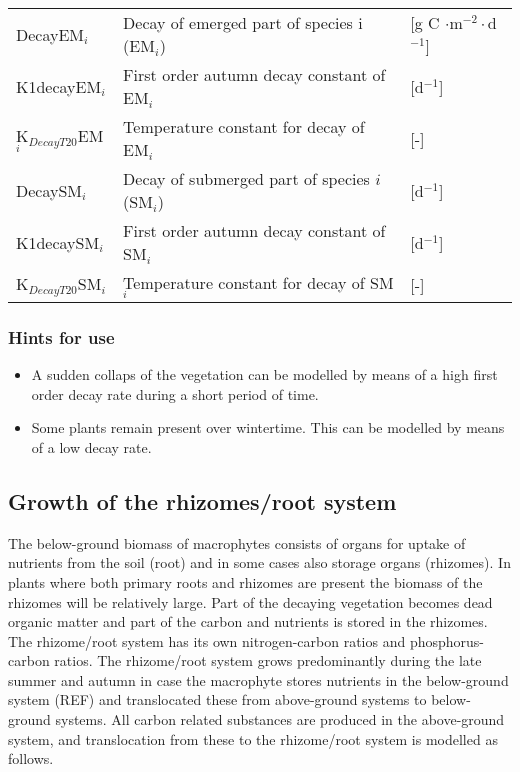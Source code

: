 \begin{tabular}{lll}
DecayEM$_i$          & Decay of emerged part of species i (EM$_i$)    & [g C $\cdot$m$^{-2}\cdot$d$^{-1}$] \\
K1decayEM$_i$        & First order autumn decay constant of EM$_i$    & [d$^{-1}$]         \\
K$_{DecayT20}$EM$_i$ & Temperature constant for decay of EM$_i$       & [-]                \\
DecaySM$_i$          & Decay of submerged part of species $i$ (SM$_i$)  & [d$^{-1}$]         \\
K1decaySM$_i$        & First order autumn decay constant of SM$_i$    & [d$^{-1}$]         \\
K$_{DecayT20}$SM$_i$ & Temperature constant for decay of SM$_i$       & [-]                \\
\end{tabular}

\subsubsection{Hints for use}
\begin{itemize}
\item
A sudden collaps of the vegetation can be modelled by means of a high first order decay rate during a
short period of time.
\item
Some plants remain present over wintertime. This can be modelled by means of a low decay rate.
\end{itemize}

\subsection{Growth of the rhizomes/root system}
The below-ground biomass of macrophytes consists of organs for uptake of nutrients from the soil (root) and in
some cases also storage organs (rhizomes). In plants where both primary roots and rhizomes are present the biomass
of the rhizomes will be relatively large. Part of the decaying vegetation becomes dead organic matter and part
of the carbon and nutrients is stored in the rhizomes. The rhizome/root system has its own nitrogen-carbon ratios
and phosphorus-carbon ratios. The rhizome/root system grows predominantly during the late summer and autumn in
case the macrophyte stores nutrients in the below-ground system (REF) and translocated these from above-ground
systems to below-ground systems. All carbon related substances are produced in the above-ground system, and
translocation from these to the rhizome/root system is modelled as follows.

